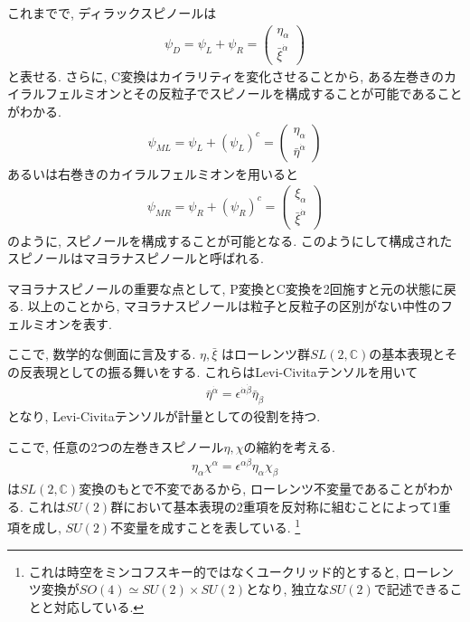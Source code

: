 これまでで, ディラックスピノールは
\begin{align}
  \psi_D = \psi_L + \psi_R = \left(\begin{array}{c}
                                  \eta_\alpha \\
                                  \bar{\xi}^{\dot{\alpha}}
                                \end{array}
                                \right)
\end{align}
と表せる.
さらに, C変換はカイラリティを変化させることから, ある左巻きのカイラルフェルミオンとその反粒子でスピノールを構成することが可能であることがわかる.
\begin{align}
  \psi_{ML} = \psi_L + (\psi_L)^c = \left(\begin{array}{c}
                                  \eta_\alpha \\
                                  \bar{\eta}^{\dot{\alpha}}
                                \end{array}
                                \right)
\end{align}
あるいは右巻きのカイラルフェルミオンを用いると
\begin{align}
  \psi_{MR} = \psi_R + (\psi_R)^c = \left(\begin{array}{c}
                                  \xi_\alpha \\
                                  \bar{\xi}^{\dot{\alpha}}
                                \end{array}
                                \right)
\end{align}
のように, スピノールを構成することが可能となる.
このようにして構成されたスピノールはマヨラナスピノールと呼ばれる.

マヨラナスピノールの重要な点として, P変換とC変換を2回施すと元の状態に戻る.
以上のことから, マヨラナスピノールは粒子と反粒子の区別がない中性のフェルミオンを表す.

ここで, 数学的な側面に言及する.
$\eta, \bar{\xi}$ はローレンツ群$SL(2,\mathbb{C})$の基本表現とその反表現としての振る舞いをする.
これらはLevi-Civitaテンソルを用いて
\begin{align}
  \bar{\eta}^{\dot{\alpha}} = \epsilon^{\dot{\alpha}\dot{\beta}}\bar{\eta}_{\dot{\beta}}
\end{align}
となり, Levi-Civitaテンソルが計量としての役割を持つ.

ここで, 任意の2つの左巻きスピノール$\eta, \chi$の縮約を考える.
\begin{align}
  \eta_\alpha \chi ^\alpha = \epsilon^{\alpha\beta}\eta_\alpha \chi_\beta \nonumber
\end{align}
は$SL(2,\mathbb{C})$変換のもとで不変であるから, ローレンツ不変量であることがわかる.
これは$SU(2)$群において基本表現の2重項を反対称に組むことによって1重項を成し, $SU(2)$不変量を成すことを表している.
\footnote{これは時空をミンコフスキー的ではなくユークリッド的とすると, ローレンツ変換が$SO(4)\simeq SU(2)\times SU(2)$となり, 独立な$SU(2)$で記述できることと対応している.}

